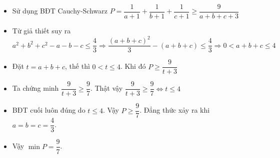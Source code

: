\lgi 
\begin{itemize}[label=,leftmargin=*]
\item Sử dụng BĐT Cauchy-Schwarz $P=\dfrac{1}{a+1}+\dfrac{1}{b+1}+\dfrac{1}{c+1}\ge \dfrac{9}{a+b+c+3}$
\item Từ giả thiết suy ra $a^2+b^2+c^2-a-b-c\le \dfrac{4}{3}\Rightarrow \dfrac{(a+b+c)^2}{3}-(a+b+c)\le \dfrac{4}{3}\Rightarrow 0<a+b+c\le 4$
\item Đặt $t=a+b+c$, thế thì $0< t\le 4$. Khi đó $P\ge \dfrac{9}{t+3}$
\item Ta chứng minh $\dfrac{9}{t+3}\ge \dfrac{9}{7}$. Thật vậy $\dfrac{9}{t+3}\ge \dfrac{9}{7}\Leftrightarrow t\le 4$ 
\item BĐT cuối luôn đúng do $t\le 4$. Vậy $P\ge \dfrac{9}{7}$. Đẳng thức xảy ra khi $a=b=c=\dfrac{4}{3}$.
\item Vậy $\min P=\dfrac{9}{7}$.
\end{itemize}